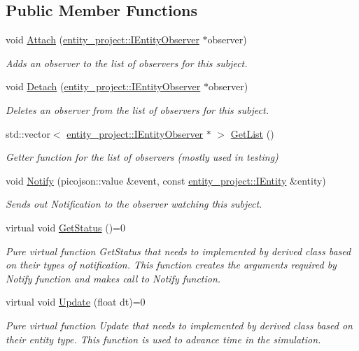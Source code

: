 \subsection*{Public Member Functions}
\begin{DoxyCompactItemize}
\item 
void \hyperlink{classcsci3081_1_1ASubject_a8a04b98cb169de561a8a861baf82c8c3}{Attach} (\hyperlink{classentity__project_1_1IEntityObserver}{entity\+\_\+project\+::\+I\+Entity\+Observer} $\ast$observer)
\begin{DoxyCompactList}\small\item\em Adds an observer to the list of observers for this subject. \end{DoxyCompactList}\item 
void \hyperlink{classcsci3081_1_1ASubject_ae077b42d8551ecf10c587250a6c46cc2}{Detach} (\hyperlink{classentity__project_1_1IEntityObserver}{entity\+\_\+project\+::\+I\+Entity\+Observer} $\ast$observer)
\begin{DoxyCompactList}\small\item\em Deletes an observer from the list of observers for this subject. \end{DoxyCompactList}\item 
std\+::vector$<$ \hyperlink{classentity__project_1_1IEntityObserver}{entity\+\_\+project\+::\+I\+Entity\+Observer} $\ast$ $>$ \hyperlink{classcsci3081_1_1ASubject_aaa18e3aab659fe04b75dd6cba8efd4fa}{Get\+List} ()
\begin{DoxyCompactList}\small\item\em Getter function for the list of observers (mostly used in testing) \end{DoxyCompactList}\item 
void \hyperlink{classcsci3081_1_1ASubject_a2f219d68c9fc28373bb6f5e90170b4ae}{Notify} (picojson\+::value \&event, const \hyperlink{classentity__project_1_1IEntity}{entity\+\_\+project\+::\+I\+Entity} \&entity)
\begin{DoxyCompactList}\small\item\em Sends out Notification to the observer watching this subject. \end{DoxyCompactList}\item 
virtual void \hyperlink{classcsci3081_1_1ASubject_a206a9ddb559da279011e2f9ea29663dc}{Get\+Status} ()=0
\begin{DoxyCompactList}\small\item\em Pure virtual function Get\+Status that needs to implemented by derived class based on their types of notification. This function creates the arguments required by Notify function and makes call to Notify function. \end{DoxyCompactList}\item 
virtual void \hyperlink{classcsci3081_1_1ASubject_a04fdda736b2eb2784e5ef10d5f70dc7a}{Update} (float dt)=0
\begin{DoxyCompactList}\small\item\em Pure virtual function Update that needs to implemented by derived class based on their entity type. This function is used to advance time in the simulation. \end{DoxyCompactList}\end{DoxyCompactItemize}

